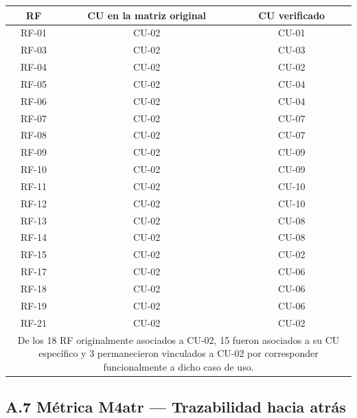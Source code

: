 \begin{tabular}{ccc}
\hline
\textbf{RF} &
\textbf{CU en la matriz original} &
\textbf{CU verificado} \\
\hline

RF-01 & CU-02 & CU-01 \\
RF-03 & CU-02 & CU-03 \\
RF-04 & CU-02 & CU-02 \\
RF-05 & CU-02 & CU-04 \\
RF-06 & CU-02 & CU-04 \\
RF-07 & CU-02 & CU-07 \\
RF-08 & CU-02 & CU-07 \\
RF-09 & CU-02 & CU-09 \\
RF-10 & CU-02 & CU-09 \\
RF-11 & CU-02 & CU-10 \\
RF-12 & CU-02 & CU-10 \\
RF-13 & CU-02 & CU-08 \\
RF-14 & CU-02 & CU-08 \\
RF-15 & CU-02 & CU-02 \\
RF-17 & CU-02 & CU-06 \\
RF-18 & CU-02 & CU-06 \\
RF-19 & CU-02 & CU-06 \\
RF-21 & CU-02 & CU-02 \\

\hline
\multicolumn{3}{p{9.5cm}}{
\footnotesize
De los 18 RF originalmente asociados a CU-02, 15 fueron asociados
a su CU específico y 3 permanecieron vinculados a CU-02 por
corresponder funcionalmente a dicho caso de uso.
} \\

\hline
\end{tabular}

\subsection*{A.7 Métrica M4atr — Trazabilidad hacia atrás}

